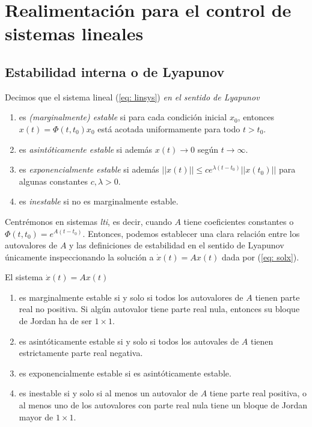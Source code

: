 \chapter{Realimentación para el control de sistemas lineales}\label{crllineales}

\section{Estabilidad interna o de Lyapunov}
\label{sec: sta}

Decimos que el sistema lineal (\ref{eq: linsys}) \emph{en el sentido de Lyapunov}
\begin{enumerate}
	\item es \emph{(marginalmente) estable} si para cada condición inicial $x_0$, entonces $x(t) = \Phi(t,t_0) x_0$ está acotada uniformamente para todo $t>t_0$.
	\item es \emph{asintóticamente estable} si además $x(t) \to 0$ según $t\to\infty$.
	\item es \emph{exponencialmente estable} si además $||x(t)|| \leq c e^{\lambda(t-t_0)}||x(t_0)||$ para algunas constantes $c,\lambda > 0$.
	\item es \emph{inestable} si no es marginalmente estable.
\end{enumerate}


Centrémonos en sistemas \emph{lti}, es decir, cuando $A$ tiene coeficientes constantes o $\Phi(t,t_0) = e^{A(t-t_0)}$. Entonces, podemos establecer una clara relación entre los autovalores de $A$ y las definiciones de estabilidad en el sentido de Lyapunov únicamente inspeccionando la solución a $\dot x(t) = Ax(t)$ dada por (\ref{eq: solx}).

El sistema $\dot x(t) = Ax(t)$
\begin{enumerate}
	\item es marginalmente estable si y solo si todos los autovalores de $A$ tienen parte real no positiva. Si algún autovalor tiene parte real nula, entonces su bloque de Jordan ha de ser $1\times 1$.
	\item es asintóticamente estable si y solo si todos los autovales de $A$ tienen estrictamente parte real negativa.
	\item es exponencialmente estable si es asintóticamente estable.
	\item es inestable si y solo si al menos un autovalor de $A$ tiene parte real positiva, o al menos uno de los autovalores con parte real nula tiene un bloque de Jordan mayor de $1\times 1$.
\end{enumerate}

